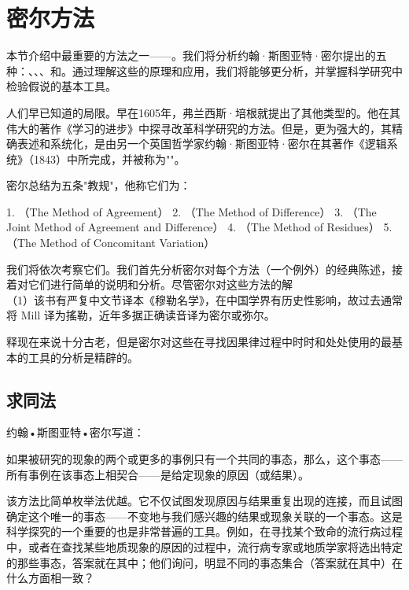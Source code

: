 \section{密尔方法}

\begin{logicbox}[title=引言]
本节介绍中最重要的方法之一——。我们将分析约翰·斯图亚特·密尔提出的五种：、、、和。通过理解这些的原理和应用，我们将能够更分析，并掌握科学研究中检验假说的基本工具。
\end{logicbox}

人们早已知道的局限。早在1605年，弗兰西斯·培根就提出了其他类型的。他在其伟大的著作《学习的进步》中探寻改革科学研究的方法。但是，更为强大的，其精确表述和系统化，是由另一个英国哲学家约翰·斯图亚特·密尔在其著作《逻辑系统》（1843）中所完成，并被称为""。

\begin{theorembox}[title=密尔的五种归纳法则]
密尔总结为五条"教规"，他称它们为：

1. （The Method of Agreement）
2. （The Method of Difference）
3. （The Joint Method of Agreement and Difference）
4. （The Method of Residues）
5. （The Method of Concomitant Variation）
\end{theorembox}

我们将依次考察它们。我们首先分析密尔对每个方法（一个例外）的经典陈述，接着对它们进行简单的说明和分析。尽管密尔对这些方法的解\\
（1）该书有严复中文节译本《穆勒名学》，在中国学界有历史性影响，故过去通常将 Mill 译为搖勒，近年多据正确读音译为密尔或弥尔。

释现在来说十分古老，但是密尔对这些在寻找因果律过程中时时和处处使用的最基本的工具的分析是精辟的。

\subsection{求同法}
约翰•斯图亚特•密尔写道：

如果被研究的现象的两个或更多的事例只有一个共同的事态，那么，这个事态——所有事例在该事态上相契合——是给定现象的原因（或结果）。

该方法比简单枚举法优越。它不仅试图发现原因与结果重复出现的连接，而且试图确定这个唯一的事态——不变地与我们感兴趣的结果或现象关联的一个事态。这是科学探究的一个重要的也是非常普遍的工具。例如，在寻找某个致命的流行病过程中，或者在查找某些地质现象的原因的过程中，流行病专家或地质学家将选出特定的那些事态，答案就在其中；他们询问，明显不同的事态集合（答案就在其中）在什么方面相一致？

